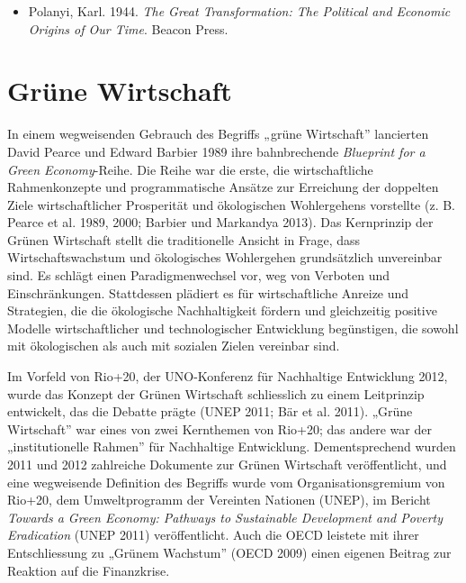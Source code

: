\documentclass[
  nswissgerman,
  a4paper,
  DIV=11,
  numbers=noendperiod,
  oneside,
  openany]{scrreprt}
\providecommand{\tightlist}{%
  \setlength{\itemsep}{0pt}\setlength{\parskip}{0pt}}
\begin{document}
\begin{tcolorbox}[enhanced jigsaw, arc=.35mm, bottomrule=.15mm, bottomtitle=1mm, breakable, colback=white, colbacktitle=quarto-callout-caution-color!10!white, colframe=quarto-callout-caution-color-frame, coltitle=black, left=2mm, leftrule=.75mm, opacityback=0, opacitybacktitle=0.6, rightrule=.15mm, title={Weiterführende Literatur}, titlerule=0mm, toprule=.15mm, toptitle=1mm]

\begin{itemize}
\tightlist
\item
  Polanyi, Karl. 1944. \emph{The Great Transformation: The Political and
  Economic Origins of Our Time}. Beacon Press.
\end{itemize}

\end{tcolorbox}

\section{Grüne Wirtschaft}\label{gruxfcne-wirtschaft}

In einem wegweisenden Gebrauch des Begriffs „grüne Wirtschaft''
lancierten David Pearce und Edward Barbier 1989 ihre bahnbrechende
\emph{Blueprint for a Green Economy}-Reihe. Die Reihe war die erste, die
wirtschaftliche Rahmenkonzepte und programmatische Ansätze zur
Erreichung der doppelten Ziele wirtschaftlicher Prosperität und
ökologischen Wohlergehens vorstellte (z. B. Pearce et al. 1989, 2000;
Barbier und Markandya 2013). Das Kernprinzip der Grünen Wirtschaft
stellt die traditionelle Ansicht in Frage, dass Wirtschaftswachstum und
ökologisches Wohlergehen grundsätzlich unvereinbar sind. Es schlägt
einen Paradigmenwechsel vor, weg von Verboten und Einschränkungen.
Stattdessen plädiert es für wirtschaftliche Anreize und Strategien, die
die ökologische Nachhaltigkeit fördern und gleichzeitig positive Modelle
wirtschaftlicher und technologischer Entwicklung begünstigen, die sowohl
mit ökologischen als auch mit sozialen Zielen vereinbar sind.

Im Vorfeld von Rio+20, der UNO-Konferenz für Nachhaltige Entwicklung
2012, wurde das Konzept der Grünen Wirtschaft schliesslich zu einem
Leitprinzip entwickelt, das die Debatte prägte (UNEP 2011; Bär et al.
2011). „Grüne Wirtschaft'' war eines von zwei Kernthemen von Rio+20; das
andere war der „institutionelle Rahmen'' für Nachhaltige Entwicklung.
Dementsprechend wurden 2011 und 2012 zahlreiche Dokumente zur Grünen
Wirtschaft veröffentlicht, und eine wegweisende Definition des Begriffs
wurde vom Organisationsgremium von Rio+20, dem Umweltprogramm der
Vereinten Nationen (UNEP), im Bericht \emph{Towards a Green Economy:
Pathways to Sustainable Development and Poverty Eradication} (UNEP 2011)
veröffentlicht. Auch die OECD leistete mit ihrer Entschliessung zu
„Grünem Wachstum'' (OECD 2009) einen eigenen Beitrag zur Reaktion auf
die Finanzkrise.
\end{document}
